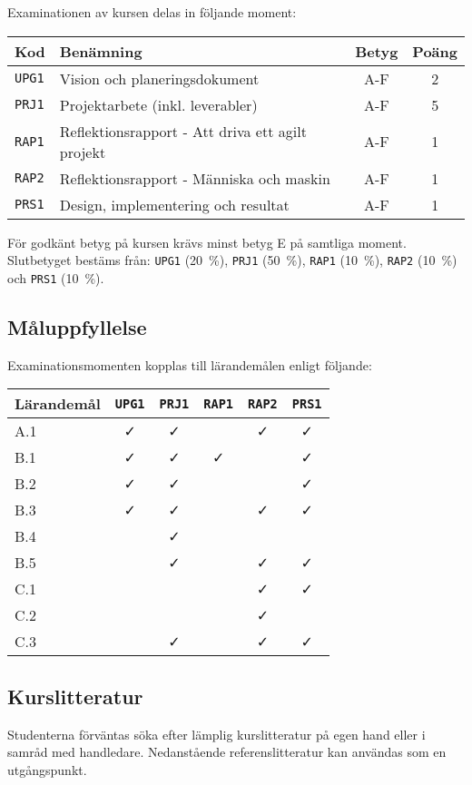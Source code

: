 Examinationen av kursen delas in följande moment:

\begin{longtable}[]{@{}llcc@{}}
\toprule
\textsf{Kod} & \textsf{Benämning} & \textsf{Betyg} & \textsf{Poäng}\tabularnewline
\midrule
\endhead
\texttt{UPG1} & Vision och planeringsdokument & A-F & 2\tabularnewline
\texttt{PRJ1} & Projektarbete (inkl. leverabler) & A-F & 5\tabularnewline
\texttt{RAP1} & Reflektionsrapport - Att driva ett agilt projekt & A-F &
1\tabularnewline
\texttt{RAP2} & Reflektionsrapport - Människa och maskin & A-F & 1\tabularnewline
\texttt{PRS1} & Design, implementering och resultat & A-F & 1\tabularnewline
\bottomrule
\end{longtable}

För godkänt betyg på kursen krävs minst betyg E på samtliga moment.
Slutbetyget bestäms från: \texttt{UPG1} (20~\%), \texttt{PRJ1} (50~\%), \texttt{RAP1} (10~\%), \texttt{RAP2}
(10~\%) och \texttt{PRS1} (10~\%).

\subsection*{Måluppfyllelse}

Examinationsmomenten kopplas till lärandemålen enligt följande:

\begin{longtable}[]{@{}lccccc@{}}
\toprule
\textsf{Lärandemål} & \texttt{UPG1} & \texttt{PRJ1} & \texttt{RAP1} & \texttt{RAP2} & \texttt{PRS1}\tabularnewline
\midrule
\endhead
A.1 & \faCheck & \faCheck & & \faCheck & \faCheck\tabularnewline
B.1 & \faCheck & \faCheck & \faCheck & & \faCheck\tabularnewline
B.2 & \faCheck & \faCheck & & & \faCheck\tabularnewline
B.3 & \faCheck & \faCheck & & \faCheck & \faCheck\tabularnewline
B.4 & & \faCheck & & &\tabularnewline
B.5 & & \faCheck & & \faCheck & \faCheck\tabularnewline
C.1 & & & & \faCheck & \faCheck\tabularnewline
C.2 & & & & \faCheck &\tabularnewline
C.3 & & \faCheck & & \faCheck & \faCheck\tabularnewline
\bottomrule
\end{longtable}

\subsection*{Kurslitteratur}

Studenterna förväntas söka efter lämplig kurslitteratur på egen hand
eller i samråd med handledare. Nedanstående referenslitteratur kan
användas som en utgångspunkt.

